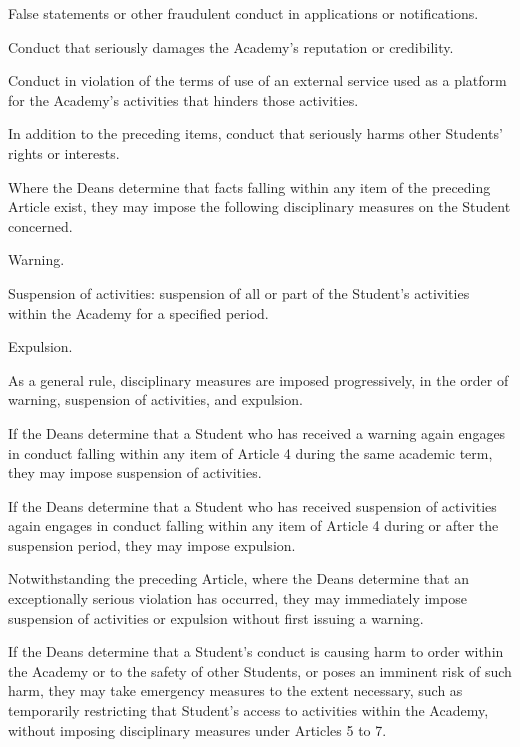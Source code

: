 \begin{articles}
\begin{subitems}
    \item False statements or other fraudulent conduct in applications or notifications.
    \item Conduct that seriously damages the Academy's reputation or credibility.
    \item Conduct in violation of the terms of use of an external service used as a platform for the Academy's activities that hinders those activities.
    \item In addition to the preceding items, conduct that seriously harms other Students' rights or interests.
  \end{subitems}
  \item Where the Deans determine that facts falling within any item of the preceding Article exist, they may impose the following disciplinary measures on the Student concerned.
  \begin{subitems}
    \item Warning.
    \item Suspension of activities: suspension of all or part of the Student's activities within the Academy for a specified period.
    \item Expulsion.
  \end{subitems}
  \item As a general rule, disciplinary measures are imposed progressively, in the order of warning, suspension of activities, and expulsion.
  \begin{paragraphs}
    \item If the Deans determine that a Student who has received a warning again engages in conduct falling within any item of Article 4 during the same academic term, they may impose suspension of activities.
    \item If the Deans determine that a Student who has received suspension of activities again engages in conduct falling within any item of Article 4 during or after the suspension period, they may impose expulsion.
  \end{paragraphs}
  \item Notwithstanding the preceding Article, where the Deans determine that an exceptionally serious violation has occurred, they may immediately impose suspension of activities or expulsion without first issuing a warning.
  \item If the Deans determine that a Student's conduct is causing harm to order within the Academy or to the safety of other Students, or poses an imminent risk of such harm, they may take emergency measures to the extent necessary, such as temporarily restricting that Student's access to activities within the Academy, without imposing disciplinary measures under Articles 5 to 7.

\end{articles}
